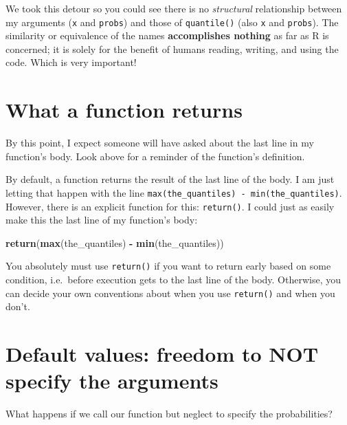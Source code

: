 \documentclass[
]{book}
\newenvironment{Shaded}{\begin{snugshade}}{\end{snugshade}}
\newcommand{\CommentTok}[1]{\textcolor[rgb]{0.56,0.35,0.01}{\textit{#1}}}
\newcommand{\KeywordTok}[1]{\textcolor[rgb]{0.13,0.29,0.53}{\textbf{#1}}}
\newcommand{\NormalTok}[1]{#1}
\newcommand{\OperatorTok}[1]{\textcolor[rgb]{0.81,0.36,0.00}{\textbf{#1}}}
\newcommand{\StringTok}[1]{\textcolor[rgb]{0.31,0.60,0.02}{#1}}
\begin{document}
We took this detour so you could see there is no \emph{structural} relationship between my arguments (\texttt{x} and \texttt{probs}) and those of \texttt{quantile()} (also \texttt{x} and \texttt{probs}). The similarity or equivalence of the names \textbf{accomplishes nothing} as far as R is concerned; it is solely for the benefit of humans reading, writing, and using the code. Which is very important!

\hypertarget{what-a-function-returns}{%
\section{What a function returns}\label{what-a-function-returns}}

By this point, I expect someone will have asked about the last line in my function's body. Look above for a reminder of the function's definition.

By default, a function returns the result of the last line of the body. I am just letting that happen with the line \texttt{max(the\_quantiles)\ -\ min(the\_quantiles)}. However, there is an explicit function for this: \texttt{return()}. I could just as easily make this the last line of my function's body:

\begin{Shaded}
\begin{Highlighting}[]
\KeywordTok{return}\NormalTok{(}\KeywordTok{max}\NormalTok{(the_quantiles) }\OperatorTok{-}\StringTok{ }\KeywordTok{min}\NormalTok{(the_quantiles))}
\end{Highlighting}
\end{Shaded}

You absolutely must use \texttt{return()} if you want to return early based on some condition, i.e.~before execution gets to the last line of the body. Otherwise, you can decide your own conventions about when you use \texttt{return()} and when you don't.

\hypertarget{default-values-freedom-to-not-specify-the-arguments}{%
\section{Default values: freedom to NOT specify the arguments}\label{default-values-freedom-to-not-specify-the-arguments}}

What happens if we call our function but neglect to specify the probabilities?

\begin{Shaded}
\end{Shaded}
\end{document}
